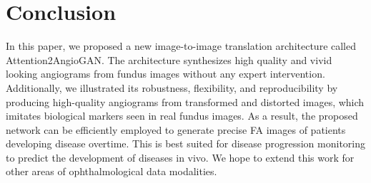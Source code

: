 \documentclass[a4paper,conference]{IEEEtran}
\begin{document}
\section{Conclusion}
In this paper, we proposed a new image-to-image translation architecture called Attention2AngioGAN. The architecture synthesizes high quality and vivid looking angiograms from fundus images without any expert intervention. Additionally, we illustrated its robustness, flexibility, and reproducibility by producing high-quality angiograms from transformed and distorted images, which imitates biological markers seen in real fundus images. As a result, the proposed network can be efficiently employed to generate precise FA images of patients developing disease overtime. This is best suited for disease progression monitoring to predict the development of diseases in vivo. We hope to extend this work for other areas of ophthalmological data modalities.














































\end{document}

